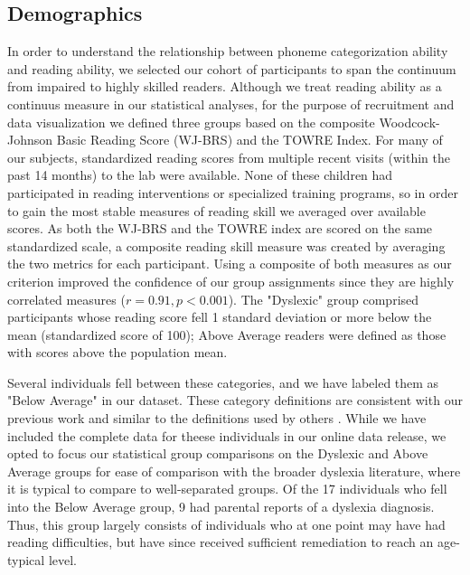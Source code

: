 \documentclass[../uwthesis.tex]{subfiles}
\begin{document}
\subsection{Demographics}
In order to understand the relationship between phoneme categorization ability and reading ability, we selected our cohort of participants to span the continuum from impaired to highly skilled readers. Although we treat reading ability as a continuus measure in our statistical analyses, for the purpose of recruitment and data visualization we defined three groups based on the composite Woodcock-Johnson Basic Reading Score (WJ-BRS) and the TOWRE Index. For many of our subjects, standardized reading scores from multiple recent visits (within the past 14 months) to the lab were available. None of these children had participated in reading interventions or specialized training programs, so in order to gain the most stable measures of reading skill we averaged over available scores. As both the WJ-BRS and the TOWRE index are scored on the same standardized scale, a composite reading skill measure was created by averaging the two metrics for each participant. Using a composite of both measures as our criterion improved the confidence of our group assignments since they are highly correlated measures ($r=0.91, p<0.001$). The "Dyslexic" group comprised participants whose reading score fell 1 standard deviation or more below the mean (standardized score of 100); Above Average readers were defined as those with scores above the population mean.

Several individuals fell between these categories, and we have labeled them as "Below Average" in our dataset. These category definitions are consistent with our previous work \cite{OBrien2018ReadingCategorization} and similar to the definitions used by others \cite{Rimrodt2010WhiteDyslexia, Shaywitz2002DisruptionDyslexia}. While we have included the complete data for theese individuals in our online data release, we opted to focus our statistical group comparisons on the Dyslexic and Above Average groups for ease of comparison with the broader dyslexia literature, where it is typical to compare to well-separated groups. Of the 17 individuals who fell into the Below Average group, 9 had parental reports of a dyslexia diagnosis. Thus, this group largely consists of individuals who at one point may have had reading difficulties, but have since received sufficient remediation to reach an age-typical level.
\end{document}
